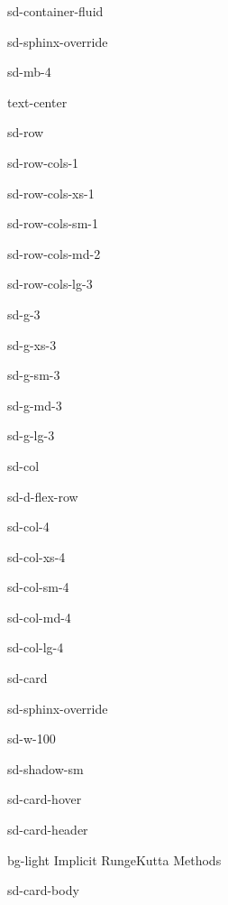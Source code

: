 \documentclass[letterpaper,10pt,english]{jupyterBook}
\begin{document}
\begin{sphinxuseclass}{sd-container-fluid}
\begin{sphinxuseclass}{sd-sphinx-override}
\begin{sphinxuseclass}{sd-mb-4}
\begin{sphinxuseclass}{text-center}
\begin{sphinxuseclass}{sd-row}
\begin{sphinxuseclass}{sd-row-cols-1}
\begin{sphinxuseclass}{sd-row-cols-xs-1}
\begin{sphinxuseclass}{sd-row-cols-sm-1}
\begin{sphinxuseclass}{sd-row-cols-md-2}
\begin{sphinxuseclass}{sd-row-cols-lg-3}
\begin{sphinxuseclass}{sd-g-3}
\begin{sphinxuseclass}{sd-g-xs-3}
\begin{sphinxuseclass}{sd-g-sm-3}
\begin{sphinxuseclass}{sd-g-md-3}
\begin{sphinxuseclass}{sd-g-lg-3}
\begin{sphinxuseclass}{sd-col}
\begin{sphinxuseclass}{sd-d-flex-row}
\begin{sphinxuseclass}{sd-col-4}
\begin{sphinxuseclass}{sd-col-xs-4}
\begin{sphinxuseclass}{sd-col-sm-4}
\begin{sphinxuseclass}{sd-col-md-4}
\begin{sphinxuseclass}{sd-col-lg-4}
\begin{sphinxuseclass}{sd-card}
\begin{sphinxuseclass}{sd-sphinx-override}
\begin{sphinxuseclass}{sd-w-100}
\begin{sphinxuseclass}{sd-shadow-sm}
\begin{sphinxuseclass}{sd-card-hover}
\begin{sphinxuseclass}{sd-card-header}
\begin{sphinxuseclass}{bg-light}
\sphinxAtStartPar
Implicit Runge\sphinxhyphen{}Kutta Methods

\end{sphinxuseclass}
\end{sphinxuseclass}
\begin{sphinxuseclass}{sd-card-body}
\begin{figure}[htbp]
\centering

\noindent{}
\end{figure}


\end{sphinxuseclass}
\end{sphinxuseclass}
\end{sphinxuseclass}
\end{sphinxuseclass}
\end{sphinxuseclass}
\end{sphinxuseclass}
\end{sphinxuseclass}
\end{sphinxuseclass}
\end{sphinxuseclass}
\end{sphinxuseclass}
\end{sphinxuseclass}
\end{sphinxuseclass}
\end{sphinxuseclass}
\end{sphinxuseclass}
\end{sphinxuseclass}
\end{sphinxuseclass}
\end{sphinxuseclass}
\end{sphinxuseclass}
\end{sphinxuseclass}
\end{sphinxuseclass}
\end{sphinxuseclass}
\end{sphinxuseclass}
\end{sphinxuseclass}
\end{sphinxuseclass}
\end{sphinxuseclass}
\end{sphinxuseclass}
\end{sphinxuseclass}
\end{sphinxuseclass}
\end{document}
